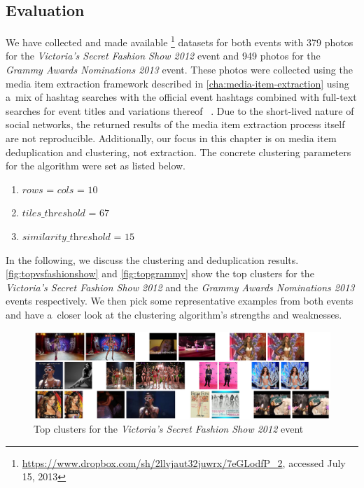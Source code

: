 \subsection{Evaluation}\label{sec:evaluation-chpater6}

We have collected and made available%
\footnote{\url{https://www.dropbox.com/sh/2llvjaut32juwrx/7eGLodfP_2},
accessed July 15, 2013}
datasets for both events with
379 photos for the \emph{Victoria's Secret Fashion Show 2012} event
and 949 photos for the \emph{Grammy Awards Nominations 2013} event.
These photos were collected using the media item extraction framework
described in \autoref{cha:media-item-extraction}
using a~mix of hashtag searches with the official event hashtags combined
with full-text searches for event titles and variations thereof~%
\cite{becker2010eventidentification,becker2012plannedevents}.
Due to the short-lived nature of social networks,
the returned results of the media item extraction process itself
are not reproducible.
Additionally, our focus in this chapter
is on media item deduplication and clustering, not extraction.
The concrete clustering parameters for the algorithm were set as listed below.

\begin{enumerate}
  \item $\textit{rows}$ = $\textit{cols}$ = $10$
  \item $\textit{tiles\_threshold}$ = $67$
  \item $\textit{similarity\_threshold}$ = $15$
\end{enumerate}

In the following, we discuss the clustering and deduplication results.
\autoref{fig:topvsfashionshow} and \autoref{fig:topgrammy} show the top clusters
for the \emph{Victoria's Secret Fashion Show 2012} and the
\emph{Grammy Awards Nominations 2013} events respectively.
We then pick some representative examples from both events
and have a~closer look at the clustering algorithm's strengths and weaknesses.

\begin{figure}[!ht]
  \centering
  \includegraphics[width=1.0\linewidth]{./vsfashionshow_clusters.png}
  \caption{Top clusters for the \emph{Victoria's Secret Fashion Show 2012} event}
  \label{fig:topvsfashionshow}
\end{figure}

